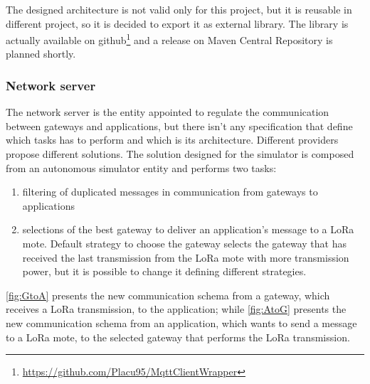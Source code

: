 \noindent The designed architecture is not valid only for this project, but it is reusable in different project, so it is decided to export it as external library. The library is actually available on github\footnote{\href{https://github.com/Placu95/MqttClientWrapper}{https://github.com/Placu95/MqttClientWrapper}} and a release on Maven Central Repository is planned shortly.

\subsubsection{Network server}
The network server is the entity appointed to regulate the communication between gateways and applications, but there isn't any specification that define which tasks has to perform and which is its architecture. 
Different providers propose different solutions. 
The solution designed for the simulator is composed from an autonomous simulator entity and performs two tasks:
\begin{enumerate}
    \item filtering of duplicated messages in communication from gateways to applications
    \item selections of the best gateway to deliver an application's message to a LoRa mote. 
    Default strategy to choose the gateway selects the gateway that has received the last transmission from the LoRa mote with more transmission power, but it is possible to change it defining different strategies. 
\end{enumerate}
\autoref{fig:GtoA} presents the new communication schema from a gateway, which receives a LoRa transmission, to the application; while \autoref{fig:AtoG} presents the new communication schema from an application, which wants to send a message to a LoRa mote, to the selected gateway that performs the LoRa transmission.
